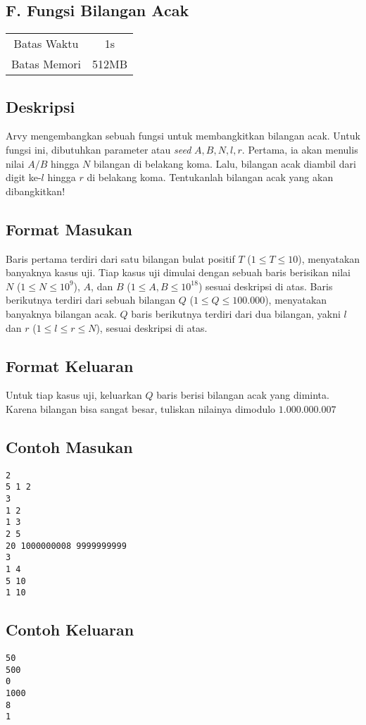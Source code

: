 \documentclass{article}
\begin{document}
\begin{center}
    \section*{F. Fungsi Bilangan Acak}

    \begin{tabular}{ | c c | }
        \hline
        Batas Waktu  & 1s \\
        Batas Memori & 512MB \\
        \hline
    \end{tabular}
\end{center}

\subsection*{Deskripsi}

Arvy mengembangkan sebuah fungsi untuk membangkitkan bilangan acak.
Untuk fungsi ini, dibutuhkan parameter atau \textit{seed} $A, B, N, l, r$.
Pertama, ia akan menulis nilai $A / B$ hingga $N$ bilangan di belakang koma.
Lalu, bilangan acak diambil dari digit ke-$l$ hingga $r$ di belakang koma.
Tentukanlah bilangan acak yang akan dibangkitkan!

\subsection*{Format Masukan}
Baris pertama terdiri dari satu bilangan bulat positif $T$ ($1 \leq T \leq 10$), menyatakan banyaknya kasus uji.
Tiap kasus uji dimulai dengan sebuah baris berisikan nilai $N$ ($1 \leq N \leq 10^{9}$), $A$, dan $B$ ($1 \leq A, B \leq 10^{18}$) sesuai deskripsi di atas.
Baris berikutnya terdiri dari sebuah bilangan $Q$ ($1 \leq Q \leq 100.000$), menyatakan banyaknya bilangan acak.
$Q$ baris berikutnya terdiri dari dua bilangan, yakni $l$ dan $r$ ($1 \leq l \leq r \leq N$), sesuai deskripsi di atas.

\subsection*{Format Keluaran}
Untuk tiap kasus uji, keluarkan $Q$ baris berisi bilangan acak yang diminta. Karena bilangan bisa sangat besar, tuliskan nilainya dimodulo $1.000.000.007$

\begin{multicols}{2}
\subsection*{Contoh Masukan}
\begin{lstlisting}
2
5 1 2
3
1 2
1 3
2 5
20 1000000008 9999999999
3
1 4
5 10
1 10
\end{lstlisting}
\columnbreak
\subsection*{Contoh Keluaran}
\begin{lstlisting}
50
500
0
1000
8
1
\end{lstlisting}
\vfill
\null
\end{multicols}
\end{document}
